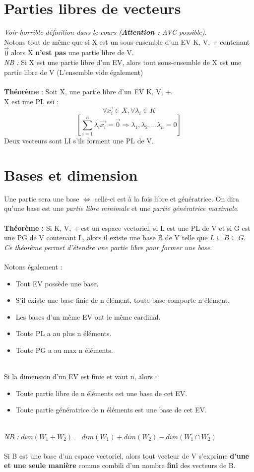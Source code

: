 \documentclass	[11pt, a4paper, openany]{book}
\begin{document}
\section{Parties libres de vecteurs}
\textit{Voir horrible définition dans le cours (\textbf{Attention :} AVC possible)}.\\
Notons tout de même que si X est un sous-ensemble d'un EV K, V, + contenant $\vec{0}$ alors X \textbf{n'est pas} une partie libre de V.\\
\textit{NB :} Si X est une partie libre d'un EV, alors tout sous-ensemble de X est une partie libre de V (L'ensemble vide également)\\\\
\textbf{Théorème } : Soit X, une partie libre d'un EV K, V, +.\\
X est une PL ssi :
$$\forall \vec{x_{i}} \in X, \forall \lambda_{i} \in K$$
$$[\sum_{i=1}^{n} \lambda_{i}\vec{x_{i}} = \vec{0} \Rightarrow \lambda_{1}, \lambda_{2}, ... \lambda_{n} = 0]$$
Deux vecteurs sont LI s'ils forment une PL de V.

\section{Bases et dimension}
Une partie sera une base $\Leftrightarrow$ celle-ci est à la fois libre et génératrice. On dira qu'une base est une \textit{partie libre minimale} et une \textit{partie génératrice maximale}.\\\\
\textbf{Théorème :} Si K, V, + est un espace vectoriel, si L est une PL de V et si G est une PG de V contenant L, alors il existe une base B de V telle que $L \subseteq B \subseteq G$.\\
\textit{Ce théorème permet d'étendre une partie libre pour former une base}.\\\\
Notons également :
\begin{itemize}
\item Tout EV possède une base.
\item S'il existe une base finie de n élément, toute base comporte n élément.
\item Les bases d'un même EV ont le même cardinal.
\item Toute PL a au plus n éléments.
\item Toute PG a au max n éléments.
\end{itemize}
\ \\
Si la dimension d'un EV est finie et vaut n, alors :
\begin{itemize}
\item Toute partie libre de n éléments est une base de cet EV.
\item Toute partie génératrice de n éléments est une base de cet EV.
\end{itemize}
\ \\
\textit{NB :} $dim(W_{1} + W_{2}) = dim(W_{1}) + dim(W_{2}) - dim(W_{1} \cap W_{2})$\\\\
Si B est une base d'un espace vectoriel, alors tout vecteur de V s'exprime \textbf{d'une et une seule manière} comme combili d'un nombre \textbf{fini} des vecteurs de B.
\end{document}
